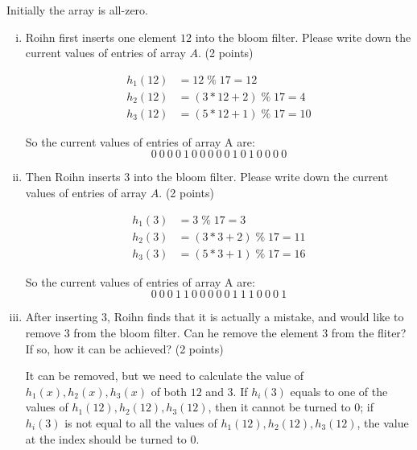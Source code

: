 \documentclass[11pt]{exam}
\begin{document}
Initially the array is all-zero.
\begin{enumerate}[i)]
\item Roihn first inserts one element $12$ into the bloom filter. Please write down the current values of entries of array $A$. (2 points)
\begin{solution}
\begin{equation*}
    \begin{aligned}
        h_{1}(12) &= 12 \;\%\; 17 = 12\\
        h_{2}(12) &= (3*12+2) \;\%\; 17 = 4\\
        h_{3}(12) &= (5*12+1) \;\%\; 17 = 10
    \end{aligned}
\end{equation*}
\par 
So the current values of entries of array A are:
\begin{equation*}
    0\ 0\ 0\ 0\ 1\ 0\ 0\ 0\ 0\ 0\ 1\ 0\ 1\ 0\ 0\ 0\ 0 
\end{equation*}
\end{solution}
\item Then Roihn inserts 3 into the bloom filter. Please write down the current values of entries of array $A$. (2 points)
\begin{solution}
\begin{equation*}
    \begin{aligned}
        h_{1}(3) &= 3 \;\%\; 17 = 3\\
        h_{2}(3) &= (3*3+2) \;\%\; 17 = 11\\
        h_{3}(3) &= (5*3+1) \;\%\; 17 = 16
    \end{aligned}
\end{equation*}
\par 
So the current values of entries of array A are:
\begin{equation*}
    0\ 0\ 0\ 1\ 1\ 0\ 0\ 0\ 0\ 0\ 1\ 1\ 1\ 0\ 0\ 0\ 1 
\end{equation*}
\end{solution}
\item After inserting 3, Roihn finds that it is actually a mistake, and would like to remove 3 from the bloom filter. Can he remove the element 3 from the fliter? If so, how it can be achieved? (2 points)
\begin{solution}
\par 
It can be removed, but we need to calculate the value of $h_{1}(x),h_{2}(x),h_{3}(x)$ of both $12$ and $3$. If $h_{i}(3)$ equals to one of the values of $h_{1}(12),h_{2}(12),h_{3}(12)$, then it cannot be turned to $0$; if $h_{i}(3)$ is not equal to all the values of $h_{1}(12),h_{2}(12),h_{3}(12)$, the value at the index should be turned to $0$.

\end{solution}
\end{enumerate}
\end{document}
